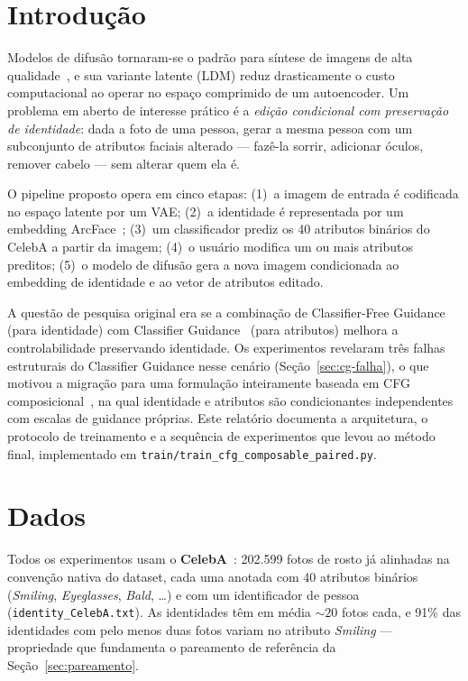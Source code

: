 \documentclass[10pt,twocolumn]{article}
\begin{document}
\section{Introdução}

Modelos de difusão tornaram-se o padrão para síntese de imagens de alta
qualidade~\cite{ho2020,rombach2022}, e sua variante latente (LDM)
\cite{rombach2022} reduz drasticamente o custo computacional ao operar no
espaço comprimido de um autoencoder. Um problema em aberto de interesse
prático é a \emph{edição condicional com preservação de identidade}: dada
a foto de uma pessoa, gerar a mesma pessoa com um subconjunto de
atributos faciais alterado --- fazê-la sorrir, adicionar óculos, remover
cabelo --- sem alterar quem ela é.

O pipeline proposto opera em cinco etapas: (1)~a imagem de entrada é
codificada no espaço latente por um VAE; (2)~a identidade é representada
por um embedding ArcFace~\cite{deng2019}; (3)~um classificador prediz os
40 atributos binários do CelebA a partir da imagem; (4)~o usuário
modifica um ou mais atributos preditos; (5)~o modelo de difusão gera a
nova imagem condicionada ao embedding de identidade e ao vetor de
atributos editado.

A questão de pesquisa original era se a combinação de Classifier-Free
Guidance~\cite{ho2022cfg} (para identidade) com Classifier
Guidance~\cite{dhariwal2021} (para atributos) melhora a controlabilidade
preservando identidade. Os experimentos revelaram três falhas estruturais
do Classifier Guidance nesse cenário (Seção~\ref{sec:cg-falha}), o que
motivou a migração para uma formulação inteiramente baseada em CFG
composicional~\cite{liu2022}, na qual identidade e atributos são
condicionantes independentes com escalas de guidance próprias. Este
relatório documenta a arquitetura, o protocolo de treinamento e a
sequência de experimentos que levou ao método final, implementado em
\texttt{train/train\_cfg\_composable\_paired.py}.

\section{Dados}

Todos os experimentos usam o \textbf{CelebA}~\cite{liu2015}: 202.599
fotos de rosto já alinhadas na convenção nativa do dataset, cada uma
anotada com 40 atributos binários (\emph{Smiling}, \emph{Eyeglasses},
\emph{Bald}, \ldots) e com um identificador de pessoa
(\texttt{identity\_CelebA.txt}). As identidades têm em média ${\sim}20$
fotos cada, e 91\% das identidades com pelo menos duas fotos variam no
atributo \emph{Smiling} --- propriedade que fundamenta o pareamento de
referência da Seção~\ref{sec:pareamento}.
\end{document}

